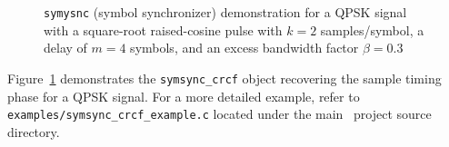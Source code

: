 %
\begin{figure}
\centering
{}
\caption{{\tt symysnc} (symbol synchronizer) demonstration for a
         QPSK signal with a
         square-root raised-cosine pulse
         with $k=2$ samples/symbol,
         a delay of $m=4$ symbols, and
         an excess bandwidth factor $\beta=0.3$}
\label{fig:module:filter:symsync}
\end{figure}
%
Figure~\ref{fig:module:filter:symsync} demonstrates the
{\tt symsync\_crcf} object recovering the sample timing phase for a QPSK
signal.
%
For a more detailed example, refer to
{\tt examples/symsync\_crcf\_example.c}
located under the main \liquid\ project source directory.


